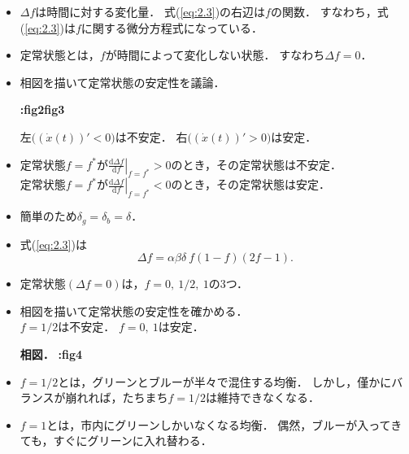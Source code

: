 \documentclass[uplatex,12pt,dvipdfmx,xcolor=svgnames]{beamer}
\newcommand{\bibun}{\mathrm{d}}
\begin{document}
\begin{frame}[t]{\secII}
	
\begin{itemize}
	\item $\Delta f$は時間に対する変化量．
		式(\ref{eq:2.3})の右辺は$f$の関数．
		すなわち，式(\ref{eq:2.3})は$f$に関する微分方程式になっている．
	\item 定常状態とは，$f$が時間によって変化しない状態．
		すなわち$\Delta f =0$．
	\item 相図を描いて定常状態の安定性を議論． 
		
			
			\textbf{:fig2fig3}
		
		左$\big((\dot{x}(t))'<0\big)$は不安定．
		右$\big((\dot{x}(t))'>0\big)$は安定．
	\item 定常状態$f=f^*$が$\left.\displaystyle\frac{\bibun \Delta f}{\bibun f}\right|_{f=f^*} >0$のとき，その定常状態は不安定．\\
	定常状態$f=f^*$が$\left.\displaystyle\frac{\bibun \Delta f}{\bibun f}\right|_{f=f^*} <0$のとき，その定常状態は安定．
\end{itemize}
	
\end{frame}


\begin{frame}[t]{\secII}

\begin{itemize}
	\item 簡単のため$\delta_g=\delta_b=\delta$．
	\item 式(\ref{eq:2.3})は
		\begin{equation*}
			\Delta f = \alpha\beta\delta\ f(1-f)(2f-1).
		\end{equation*}
	\item 定常状態$(\Delta f =0)$は，$f=0,\ 1/2,\ 1$の3つ．
	\item 相図を描いて定常状態の安定性を確かめる．\\
		$f=1/2$は不安定．
		$f=0,\ 1$は安定．
		
			
			\textbf{相図．}
			\textbf{:fig4}
		
	\item $f=1/2$とは，グリーンとブルーが半々で混住する均衡．
		しかし，僅かにバランスが崩れれば，たちまち$f=1/2$は維持できなくなる．
	\item $f=1$とは，市内にグリーンしかいなくなる均衡．
		偶然，ブルーが入ってきても，すぐにグリーンに入れ替わる．
\end{itemize}
	
	
\end{frame}
\end{document}
